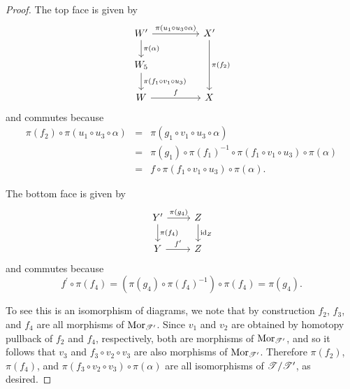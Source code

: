 \documentclass[dissertation.tex]{subfiles}
\begin{document}
\begin{lem}
\begin{proof}
    The top face is given by
    $$\begin{tikzcd}
      W^\prime \arrow{rr}{\pi(u_1 \circ u_3 \circ \alpha)}\arrow{d}{\pi(\alpha)} & & X^\prime\arrow{dd}{\pi(f_2)}\\
      W_5\arrow{d}{\pi(f_1 \circ v_1 \circ u_3)}\\
      W \arrow{rr}{f} & & X
    \end{tikzcd}$$
    and commutes because
    \begin{eqnarray*}
      \pi(f_2) \circ \pi(u_1 \circ u_3 \circ \alpha) &=& \pi(g_1 \circ v_1 \circ u_3 \circ \alpha)\\
      &=& \pi(g_1) \circ \pi(f_1)^{-1} \circ \pi(f_1 \circ v_1 \circ u_3) \circ \pi(\alpha)\\
      &=& f \circ \pi(f_1 \circ v_1 \circ u_3)\circ\pi(\alpha).
    \end{eqnarray*}
    
    The bottom face is given by
    $$\begin{tikzcd}
      Y^\prime\arrow{r}{\pi(g_4)}\arrow{d}{\pi(f_4)} & Z\arrow{d}{\id_Z}\\
      Y\arrow{r}{f^\prime} & Z
    \end{tikzcd}$$
    and commutes because
    $$f^\prime \circ \pi(f_4) = \left(\pi(g_4) \circ \pi(f_4)^{-1}\right) \circ \pi(f_4) = \pi(g_4).$$
    
    To see this is an isomorphism of diagrams, we note that by construction $f_2$, $f_3$, and $f_4$ are all morphisms of $\operatorname{Mor}_{\mathscr{T}^\prime}$.
    Since $v_1$ and $v_2$ are obtained by homotopy pullback of $f_2$ and $f_4$, respectively, both are morphisms of $\operatorname{Mor}_{\mathscr{T}^\prime}$, and so it follows that $v_3$ and $f_3 \circ v_2 \circ v_3$ are also morphisms of $\operatorname{Mor}_{\mathscr{T}^\prime}$.
    Therefore $\pi(f_2)$, $\pi(f_4)$, and $\pi(f_3 \circ v_2 \circ v_3) \circ \pi(\alpha)$ are all isomorphisms of $\mathscr{T}/\mathscr{T}^\prime$, as desired.
  \end{proof}
\end{lem}
\end{document}
